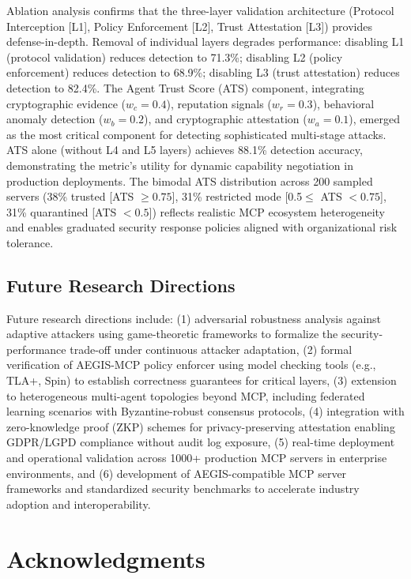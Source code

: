 \documentclass[12pt,twocolumn,journal]{IEEEtran}
\begin{document}
Ablation analysis confirms that the three-layer validation architecture (Protocol Interception [L1], Policy Enforcement [L2], Trust Attestation [L3]) provides defense-in-depth. Removal of individual layers degrades performance: disabling L1 (protocol validation) reduces detection to 71.3\%; disabling L2 (policy enforcement) reduces detection to 68.9\%; disabling L3 (trust attestation) reduces detection to 82.4\%. The Agent Trust Score (ATS) component, integrating cryptographic evidence ($w_c = 0.4$), reputation signals ($w_r = 0.3$), behavioral anomaly detection ($w_b = 0.2$), and cryptographic attestation ($w_a = 0.1$), emerged as the most critical component for detecting sophisticated multi-stage attacks. ATS alone (without L4 and L5 layers) achieves 88.1\% detection accuracy, demonstrating the metric's utility for dynamic capability negotiation in production deployments. The bimodal ATS distribution across 200 sampled servers (38\% trusted [ATS $\geq 0.75$], 31\% restricted mode [0.5$\leq$ ATS $< 0.75$], 31\% quarantined [ATS $< 0.5$]) reflects realistic MCP ecosystem heterogeneity and enables graduated security response policies aligned with organizational risk tolerance.

\subsection{Future Research Directions}

Future research directions include: (1) adversarial robustness analysis against adaptive attackers using game-theoretic frameworks to formalize the security-performance trade-off under continuous attacker adaptation, (2) formal verification of AEGIS-MCP policy enforcer using model checking tools (e.g., TLA+, Spin) to establish correctness guarantees for critical layers, (3) extension to heterogeneous multi-agent topologies beyond MCP, including federated learning scenarios with Byzantine-robust consensus protocols, (4) integration with zero-knowledge proof (ZKP) schemes for privacy-preserving attestation enabling GDPR/LGPD compliance without audit log exposure, (5) real-time deployment and operational validation across 1000+ production MCP servers in enterprise environments, and (6) development of AEGIS-compatible MCP server frameworks and standardized security benchmarks to accelerate industry adoption and interoperability.

\section*{Acknowledgments}
\end{document}
